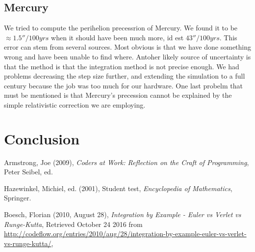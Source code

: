 \documentclass[10pt,a4paper]{amsart}
\begin{document}
\subsection{Mercury}

We tried to compute the perihelion precessrion of Mercury. We found it to be $\approx1.5''/100yrs$ when it should have been much more, id est $43''/100yrs$. This error can stem from several sources. Most obvious is that we have done something wrong and have been unable to find where. Antoher likely source of uncertainty is that the method is that the integration method is not precise enough. We had problems decreasing the step size further, and extending the simulation to a full century because the job was too much for our hardware. One last probelm that must be mentioned is that Mercury's precession cannot be explained by the simple relativistic correction we are employing.

\section{Conclusion}

\begin{thebibliography}{9}

	Armstrong, Joe (2009),
	\emph{Coders at Work: Reflection on the Craft of Programming},
	Peter Seibel, ed.

	Hazewinkel, Michiel, ed. (2001), 
	Student test,
	\emph{Encyclopedia of Mathematics},
	Springer.
	
	Boesch, Florian (2010, August 28),
	\emph{Integration by Example - Euler vs Verlet vs Runge-Kutta},
	Retrieved October 24 2016 from \url{http://codeflow.org/entries/2010/aug/28/integration-by-example-euler-vs-verlet-vs-runge-kutta/},

\end{thebibliography}

\pagebreak
\end{document}
